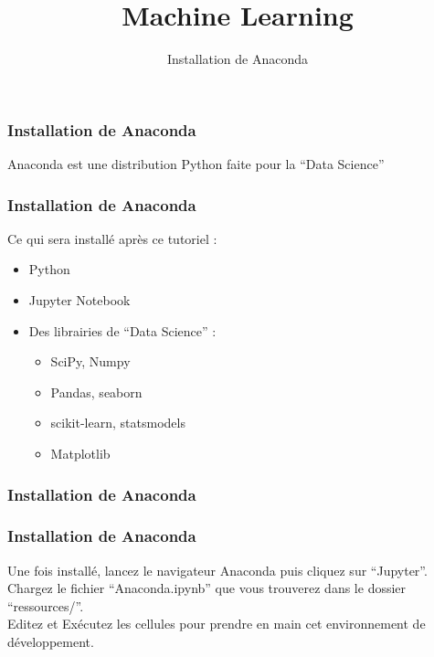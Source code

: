 \documentclass{formation}
\title{Machine Learning}
\subtitle{Installation de Anaconda}
\begin{document}
\maketitle

\begin{frame}
  \frametitle{Installation de Anaconda}
  Anaconda est une distribution Python faite pour la ``Data Science'' \\
\end{frame}

\begin{frame}
  \frametitle{Installation de Anaconda}
  Ce qui sera installé après ce tutoriel :
  \begin{itemize}
  \item Python
  \item Jupyter Notebook
  \item Des librairies de ``Data Science'' :
    \begin{itemize}
    \item SciPy, Numpy
    \item Pandas, seaborn
    \item scikit-learn, statsmodels
    \item Matplotlib
    \end{itemize}
  \end{itemize}
\end{frame}

\begin{frame}
  \frametitle{Installation de Anaconda}
\end{frame}

\begin{frame}
  \frametitle{Installation de Anaconda}
  Une fois installé, lancez le navigateur Anaconda puis cliquez sur ``Jupyter''. \\
  Chargez le fichier ``Anaconda.ipynb'' que vous trouverez dans le dossier ``ressources/''. \\
  Editez et Exécutez les cellules pour prendre en main cet environnement de développement.
\end{frame}
\end{document}
